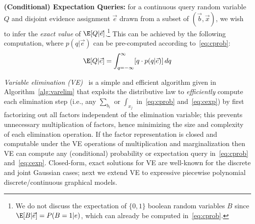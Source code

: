 \documentclass[letterpaper]{article}
\renewcommand{\-}{\text{-}}
\begin{document}
{%
{\bf (Conditional) Expectation Queries:} for a continuous
query random variable
$Q$ and disjoint evidence assignment $\vec{e}$ drawn from 
a subset of $(\vec{b},\vec{x})$, we wish to infer 
the \emph{exact value} of $\E[Q|\vec{e}]$.\footnote{We do not 
discuss the expectation of $\{0,1\}$ boolean
random variables $B$ since $\E[B|\vec{e}] = P(B=1|e)$, which can 
already be computed in~\eqref{eq:cprob}.} 
This can be achieved by the following
computation, where $p(q|\vec{e})$ can be pre-computed according to~\eqref{eq:cprob}:
\vspace{-0.5mm}
{\footnotesize 
\begin{equation} 
\E[Q|\vec{e}] = 
\int_{q=-\infty}^{\infty} [q \cdot p(q|\vec{e})] \, dq \label{eq:cexp}
\vspace{-0.5mm}
\end{equation}
}

\emph{Variable elimination (VE)}~\cite{varelim} is a simple and
efficient algorithm given in Algorithm~\ref{alg:varelim} that exploits
the distributive law to \emph{efficiently} compute each elimination
step (i.e., any $\sum_{b_{i}}$ or $\int_{x_{j}}$ in~\eqref{eq:cprob}
and~\eqref{eq:cexp}) by first factorizing out all factors independent
of the elimination variable; this prevents unnecessary multiplication
of factors, hence minimizing the size and complexity of each
elimination operation.  If the factor representation is closed and
computable under the VE operations of multiplication and
marginalization then VE can compute any (conditional) probability or
expectation query in~\eqref{eq:cprob} and~\eqref{eq:cexp}.  
Closed-form, exact solutions for VE are well-known for the discrete
and joint Gaussian cases; next we extend VE to expressive
piecewise polynomial discrete/continuous graphical models.


\incmargin{1.5em}
\linesnumbered
\begin{algorithm}[hb!]
\dontprintsemicolon


\end{algorithm}}
\end{document}
